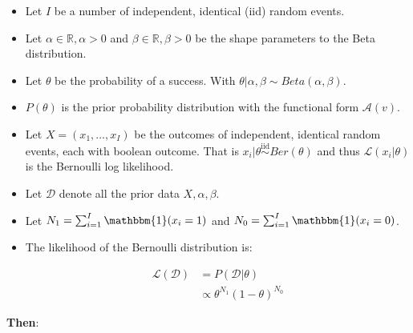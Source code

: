 \begin{itemize}
	\item Let $I$ be a number of independent, identical  (iid) random events.
	\item Let $\alpha \in \mathbb{R}, \alpha > 0$ and $\beta \in \mathbb{R}, \beta >0$ be the shape parameters to the Beta distribution.
	\item Let $\theta$ be the probability of a success. With $\theta | \alpha, \beta \sim Beta(\alpha, \beta)$.
	\item $P(\theta)$ is the prior probability distribution with the functional form $\mathcal{A}(v)$.
	\item Let $X = (x_{1}, \dots, x_{I})$ be the outcomes of independent, identical random events, each with boolean outcome. That is $x_{i} | \theta \overset{\text{iid}}{\sim} Ber(\theta)$ and thus $\mathcal{L}(x_{i} \vert \theta)$ is the Bernoulli log likelihood.
	\item Let $\mathcal{D}$ denote all the prior data $X, \alpha, \beta$.
	\item Let $N_{1} = \sum_{i=1}^{I} \mathbbm{1}(x_{i} = 1)$ and $N_{0} = \sum_{i=1}^{I} \mathbbm{1}(x_{i} = 0)$.
	\item  The likelihood of the Bernoulli distribution is:
	
\begin{equation}
\begin{split}
	\mathcal{L}(\mathcal{D}) &=  P(\mathcal{D} | \theta) \\
	&\propto \theta^{N_{1}}(1-\theta)^{N_{0}}
\end{split}
\end{equation}

\end{itemize}

\textbf{Then}:

